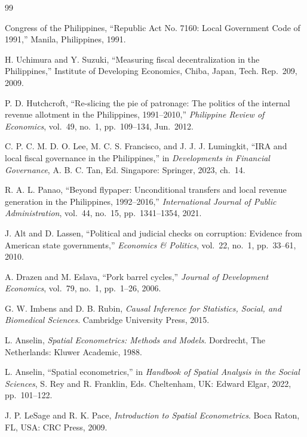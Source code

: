 \documentclass[conference]{IEEEtran}
\begin{document}
\begin{thebibliography}{99}

Congress of the Philippines, ``Republic Act No. 7160: Local Government Code of 1991,'' Manila, Philippines, 1991.

H. Uchimura and Y. Suzuki, ``Measuring fiscal decentralization in the Philippines,'' Institute of Developing Economics, Chiba, Japan, Tech. Rep.~209, 2009.

P. D. Hutchcroft, ``Re-slicing the pie of patronage: The politics of the internal revenue allotment in the Philippines, 1991--2010,'' \textit{Philippine Review of Economics}, vol.~49, no.~1, pp.~109--134, Jun.~2012.

C. P. C. M. D. O. Lee, M. C. S. Francisco, and J. J. J. Lumingkit, ``IRA and local fiscal governance in the Philippines,'' in \textit{Developments in Financial Governance}, A. B. C. Tan, Ed. Singapore: Springer, 2023, ch.~14.

R. A. L. Panao, ``Beyond flypaper: Unconditional transfers and local revenue generation in the Philippines, 1992--2016,'' \textit{International Journal of Public Administration}, vol.~44, no.~15, pp.~1341--1354, 2021.

J. Alt and D. Lassen, ``Political and judicial checks on corruption: Evidence from American state governments,'' \textit{Economics \& Politics}, vol.~22, no.~1, pp.~33--61, 2010.

A. Drazen and M. Eslava, ``Pork barrel cycles,'' \textit{Journal of Development Economics}, vol.~79, no.~1, pp.~1--26, 2006.

G. W. Imbens and D. B. Rubin, \textit{Causal Inference for Statistics, Social, and Biomedical Sciences}. Cambridge University Press, 2015.

L. Anselin, \textit{Spatial Econometrics: Methods and Models}. Dordrecht, The Netherlands: Kluwer Academic, 1988.

L. Anselin, ``Spatial econometrics,'' in \textit{Handbook of Spatial Analysis in the Social Sciences}, S. Rey and R. Franklin, Eds. Cheltenham, UK: Edward Elgar, 2022, pp.~101--122.

J. P. LeSage and R. K. Pace, \textit{Introduction to Spatial Econometrics}. Boca Raton, FL, USA: CRC Press, 2009.


\end{thebibliography}
\end{document}
